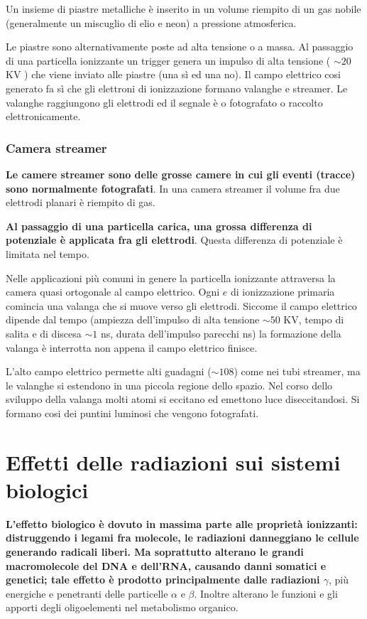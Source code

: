\documentclass[a4paper,11pt,twoside,openany]{book}
\theoremstyle{definition}
\theoremstyle{plain}
\theoremstyle{plain}
\theoremstyle{definition}
\begin{document}
Un insieme di piastre metalliche è inserito in un volume riempito di un gas nobile (generalmente un miscuglio di elio e neon) a pressione atmosferica.

Le piastre sono alternativamente poste ad alta tensione o a massa. Al passaggio di una particella ionizzante un trigger genera un impulso di alta tensione ( $\sim 20$ KV ) che viene inviato alle piastre (una sì ed una no). Il campo elettrico cosi generato fa sì che gli elettroni di ionizzazione formano valanghe e streamer. Le valanghe raggiungono gli elettrodi ed il segnale è o fotografato o raccolto elettronicamente.

\subsection{Camera streamer} %
\textbf{Le camere streamer sono delle grosse camere in cui gli eventi (tracce) sono normalmente fotografati}. In una camera streamer il volume fra due elettrodi planari è riempito di gas.

\textbf{Al passaggio di una particella carica, una grossa differenza di potenziale è applicata fra gli elettrodi}. Questa differenza di potenziale è limitata nel tempo.

Nelle applicazioni più comuni in genere la particella ionizzante attraversa la camera quasi ortogonale al campo elettrico. Ogni $e$ di ionizzazione primaria comincia una valanga che si muove verso gli elettrodi. Siccome il campo elettrico dipende dal tempo (ampiezza dell’impulso di alta tensione $\sim 50$ KV, tempo di salita e di discesa $\sim 1$ ns, durata dell’impulso parecchi ns) la formazione della valanga è interrotta non appena il campo elettrico finisce.

L’alto campo elettrico permette alti guadagni ($\sim 108$) come nei tubi streamer, ma le valanghe si estendono in una piccola regione dello spazio. Nel corso dello sviluppo della valanga molti atomi si eccitano ed emettono luce diseccitandosi. Si formano cosi dei puntini luminosi che vengono fotografati.

\chapter[Effetti biologici]{Effetti delle radiazioni sui sistemi biologici} %
\textbf{L'effetto biologico è dovuto in massima parte alle proprietà ionizzanti: distruggendo i legami fra molecole, le radiazioni danneggiano le cellule generando radicali liberi. Ma soprattutto alterano le grandi macromolecole del DNA e dell'RNA, causando danni somatici e genetici; tale effetto è prodotto principalmente dalle radiazioni $\gamma$}, più energiche e penetranti delle particelle $\alpha$ e $\beta$. Inoltre alterano le funzioni e gli apporti degli oligoelementi nel metabolismo organico.
\end{document}
